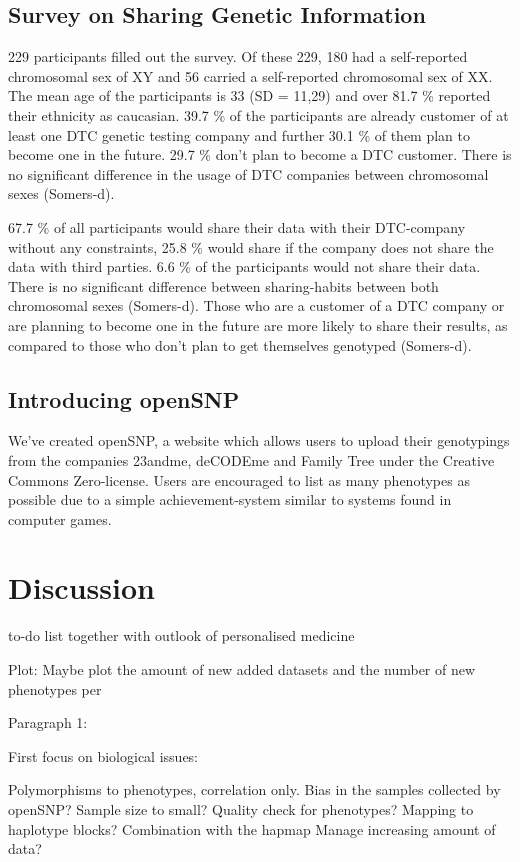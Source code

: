 \documentclass[10pt]{article}
\begin{document}
\subsection*{Survey on Sharing Genetic Information}
229 participants filled out the survey. Of these 229, 180 had a self-reported chromosomal sex of XY and 56 carried a self-reported chromosomal sex of XX. The mean age of the participants is 33 (SD = 11,29) and over 81.7 \% reported their ethnicity as caucasian. 39.7 \% of the participants are already customer of at least one DTC genetic testing company and further 30.1 \% of them plan to become one in the future. 29.7 \% don't plan to become a DTC customer. There is no significant difference in the usage of DTC companies between chromosomal sexes (Somers-d). 

67.7 \% of all participants would share their data with their DTC-company without any constraints, 25.8 \% would share if the company does not share the data with third parties. 6.6 \% of the participants would not share their data. There is no significant difference between sharing-habits between both chromosomal sexes (Somers-d). Those who are a customer of a DTC company or are planning to become one in the future are more likely to share their results, as compared to those who don't plan to get themselves genotyped (Somers-d). 

\subsection*{Introducing openSNP}
We've created openSNP, a website which allows users to upload their genotypings from the companies 23andme, deCODEme and Family Tree under the Creative Commons Zero-license. Users are encouraged to list as many phenotypes as possible due to a simple achievement-system similar to systems found in computer games. 

\section*{Discussion}
to-do list together with outlook of personalised medicine


Plot: Maybe plot the amount of new added datasets and the number of new phenotypes per 

Paragraph 1:

First focus on biological issues:

Polymorphisms to phenotypes, correlation only.
Bias in the samples collected by openSNP?
Sample size to small?
Quality check for phenotypes?
Mapping to haplotype blocks?
Combination with the hapmap
Manage increasing amount of data?
\end{document}
